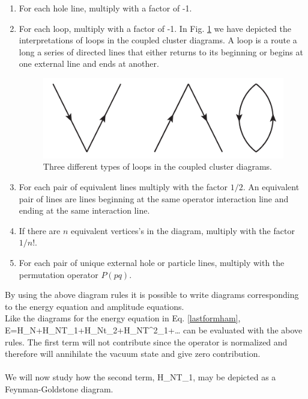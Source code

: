 \begin{enumerate}
\item For each hole line, multiply with a factor of -1.

\item For each loop, multiply with a factor of -1. In Fig. \ref{loops} we have depicted the interpretations of loops in the coupled cluster diagrams. A loop is a route a long a series of directed lines that either returns to its beginning or begins at one external line and ends at another.
\begin{figure}[htp]
\centering
\includegraphics[scale=0.75]{loops}
\caption{Three different types of loops in the coupled cluster diagrams.}
\label{loops}
\end{figure}

\item For each pair of equivalent lines multiply with the factor $1/2$. An equivalent pair of lines are lines beginning at the same operator interaction line and ending at the same interaction line.

\item If there are $n$ equivalent vertices's in the diagram, multiply
with the factor $1/n!.$

\item For each pair of unique external hole or particle lines, multiply with
 the permutation operator $P(pq).$


\end{enumerate}
By using the above diagram rules it is possible to write diagrams
corresponding to the energy equation and amplitude equations. \\
Like the diagrams for the energy equation in Eq. \eqref{lastformham}, 
\be
E=H_N+H_NT_1+H_Nt_2+H_NT^2_1+\dots {}
\ee
can be evaluated with the above rules. The first term will not
contribute since the operator is normalized and therefore will
annihilate the vacuum state and give zero contribution.\\
\\
We will now study how the second term,
\be
{}H_NT_1,
\label{firstendi}
\ee
may be depicted as a Feynman-Goldstone diagram.\\
